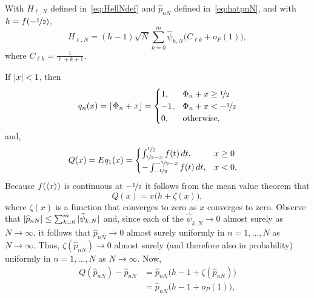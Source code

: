 \documentclass[journal]{IEEEtran}
\begin{document}
\begin{lemma}\label{lem:sumpNhilb}
With $H_{\ell,N}$ defined in~\eqref{eq:HellNdef} and $\widehat{p}_{nN}$ defined in~\eqref{eq:hatpnN}, and with $h = f(-\nicefrac{1}{2})$,
\[
H_{\ell,N} = (h-1)\sqrt{N} \sum_{k=0}^{m}  \widehat{\psi}_{k,N} \big(C_{\ell k} + o_P(1)\big),
\]
where $C_{\ell k} = \tfrac{1}{\ell + k + 1}$.
\end{lemma}
\begin{IEEEproof}
If $\left\vert x \right\vert < 1$, then
\[
q_n(x)  = {\left\lceil \Phi_n + x \right\rfloor} = \begin{cases}
1, & \Phi_n + x  \geq \nicefrac{1}{2} \\
-1, & \Phi_n + x  < -\nicefrac{1}{2} \\
0, & \text{otherwise},
\end{cases}
\]
and,
\begin{align*}
Q(x) = Eq_1(x) &=  \begin{cases}
\int_{\nicefrac{1}{2} -x }^{\nicefrac{1}{2}}f(t)\,dt, &   x \geq 0 \\
-\int_{-\nicefrac{1}{2}}^{-\nicefrac{1}{2} - x }f(t)\,dt, &  x  < 0.
\end{cases} 
\end{align*}
Because $f(\left\langle x \right\rangle)$ is continuous at $-\nicefrac{1}{2}$ it follows from the mean value theorem that
\[
Q(x) = x \big( h + \zeta(x) \big),
\] 
where $\zeta(x)$ is a function that converges to zero as $x$ converges to zero.  
Observe that $\left\vert \widehat{p}_{nN} \right\vert \leq \sum_{k=0}^m\vert  \widehat{\psi}_{k,N} \vert$ and, since each of the $\widehat{\psi}_{k,N} \rightarrow 0$ almost surely as $N\rightarrow\infty$, it follows that $\widehat{p}_{nN} \rightarrow 0$ almost surely uniformly in $n = 1, \dots, N$ as $N\rightarrow\infty$.  Thus, $\zeta(\widehat{p}_{nN}) \rightarrow 0$ almost surely (and therefore also in probability) uniformly in $n = 1, \dots, N$ as $N\rightarrow\infty$.  Now,
\begin{align*}
Q(\widehat{p}_{nN}) - \widehat{p}_{nN} &= \widehat{p}_{nN}\big( h - 1 + \zeta(\widehat{p}_{nN}) \big) \\
&= \widehat{p}_{nN}\big( h - 1 + o_P(1) \big), 
\end{align*}

\end{IEEEproof}
\end{document}
